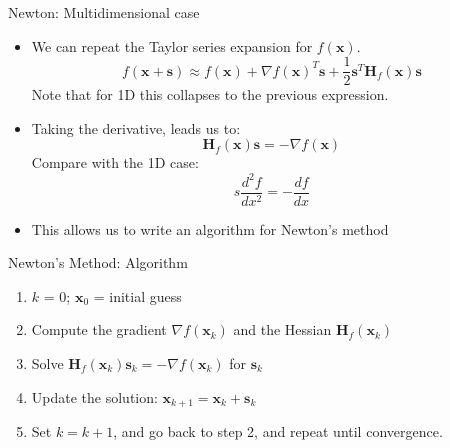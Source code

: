 \documentclass[xcolor=dvipsnames,11pt]{beamer}
\begin{document}
\begin{frame}{Newton: Multidimensional case}
	\begin{itemize}
		\item We can repeat the Taylor series expansion for $f(\mathbf{x})$. 
		$$f(\mathbf{x}+\mathbf{s}) \approx f(\mathbf{x}) + \nabla f(\mathbf{x})^T \mathbf{s} + \dfrac{1}{2} \mathbf{s}^T \mathbf{H}_f(\mathbf{x}) \mathbf{s}$$
		Note that for 1D this collapses to the previous expression.
		\item Taking the derivative, leads us to:
		$$\mathbf{H}_f(\mathbf{x}) \mathbf{s} = -\nabla f(\mathbf{x})$$
		Compare with the 1D case:
		$$s \dfrac{d^2f}{dx^2} = - \dfrac{df}{dx}$$
		\vspace*{-\baselineskip}%
		\item This allows us to write an algorithm for Newton's method
	\end{itemize}
\end{frame}



\begin{frame}{Newton's Method: Algorithm}
	\begin{enumerate}
		\item $k$ = 0; $\mathbf{x}_0$ = initial guess
		\item Compute the gradient $\nabla f(\mathbf{x}_k)$ and the Hessian $\mathbf{H}_f(\mathbf{x}_k)$
		\item Solve $\mathbf{H}_f(\mathbf{x}_k) \mathbf{s}_k = -\nabla f(\mathbf{x}_k)$ for $\mathbf{s}_k$
		\item Update the solution: $\mathbf{x}_{k+1} = \mathbf{x}_k + \mathbf{s}_k$
		\item Set $k = k + 1$, and go back to step 2, and repeat until convergence.
	\end{enumerate}
\end{frame}
\end{document}
